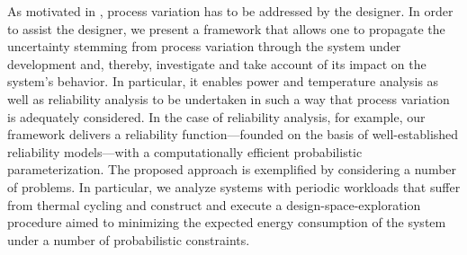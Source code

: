As motivated in , process variation has to be addressed
by the designer. In order to assist the designer, we present a framework that
allows one to propagate the uncertainty stemming from process variation through
the system under development and, thereby, investigate and take account of its
impact on the system's behavior. In particular, it enables power and temperature
analysis as well as reliability analysis to be undertaken in such a way that
process variation is adequately considered. In the case of reliability analysis,
for example, our framework delivers a reliability function---founded on the
basis of well-established reliability models---with a computationally efficient
probabilistic parameterization. The proposed approach is exemplified by
considering a number of problems. In particular, we analyze systems with
periodic workloads that suffer from thermal cycling and construct and execute a
design-space-exploration procedure aimed to minimizing the expected energy
consumption of the system under a number of probabilistic constraints.
